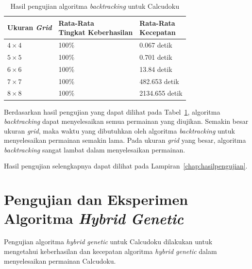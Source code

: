 \begin{table}
\centering
\captionsetup{justification=centering}
\caption[Hasil pengujian algoritma \textit{backtracking} untuk Calcudoku]{Hasil pengujian algoritma \textit{backtracking} untuk Calcudoku}
\begin{tabular}{| l | l | l |}
\hline
Ukuran \textit{Grid} & \makecell[c]{Rata-Rata \\ Tingkat Keberhasilan} & \makecell[c]{Rata-Rata \\ Kecepatan} \\
\hline \hline
\begin{math}4 \times 4\end{math} & 100\% & 0.067 detik \\
\hline
\begin{math}5 \times 5\end{math} & 100\% & 0.701 detik \\
\hline
\begin{math}6 \times 6\end{math} & 100\% & 13.84 detik \\
\hline
\begin{math}7 \times 7\end{math} & 100\% & 482.653 detik \\
\hline
\begin{math}8 \times 8\end{math} & 100\% & 2134.655 detik \\
\hline
\end{tabular}
\label{tab:pengujianbt}
\end{table}

Berdasarkan hasil pengujian yang dapat dilihat pada Tabel~\ref{tab:pengujianbt}, algoritma \textit{backtracking} dapat menyelesaikan semua permainan yang diujikan. Semakin besar ukuran \textit{grid}, maka waktu yang dibutuhkan oleh algoritma \textit{backtracking} untuk menyelesaikan permainan semakin lama. Pada ukuran \textit{grid} yang besar, algoritma \textit{backtracking} sangat lambat dalam menyelesaikan permainan.

Hasil pengujian selengkapnya dapat dilihat pada Lampiran~\ref{chap:hasilpengujian}.

\section{Pengujian dan Eksperimen Algoritma \textit{Hybrid Genetic}}
\label{sec:pengujianhybridgenetic}

Pengujian algoritma \textit{hybrid genetic} untuk Calcudoku dilakukan untuk mengetahui keberhasilan dan kecepatan algoritma \textit{hybrid genetic} dalam menyelesaikan permainan Calcudoku.

